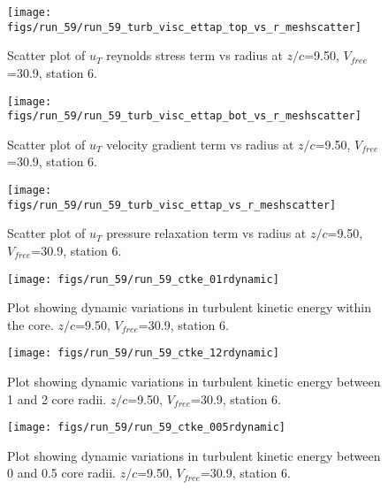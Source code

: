\begin{figure}[H]
\centering
\texttt{[image: figs/run\_59/run\_59\_turb\_visc\_ettap\_top\_vs\_r\_meshscatter]}
\caption{Scatter plot of $
u_T$ reynolds stress term vs radius at $z/c$=9.50, $V_{free}$=30.9, station 6.}
\label{fig:run_59_turb_visc_ettap_top_vs_r_meshscatter}
\end{figure}


\begin{figure}[H]
\centering
\texttt{[image: figs/run\_59/run\_59\_turb\_visc\_ettap\_bot\_vs\_r\_meshscatter]}
\caption{Scatter plot of $
u_T$ velocity gradient term vs radius at $z/c$=9.50, $V_{free}$=30.9, station 6.}
\label{fig:run_59_turb_visc_ettap_bot_vs_r_meshscatter}
\end{figure}


\begin{figure}[H]
\centering
\texttt{[image: figs/run\_59/run\_59\_turb\_visc\_ettap\_vs\_r\_meshscatter]}
\caption{Scatter plot of $
u_T$ pressure relaxation term vs radius at $z/c$=9.50, $V_{free}$=30.9, station 6.}
\label{fig:run_59_turb_visc_ettap_vs_r_meshscatter}
\end{figure}


\begin{figure}[H]
\centering
\texttt{[image: figs/run\_59/run\_59\_ctke\_01rdynamic]}
\caption{Plot showing dynamic variations in turbulent kinetic energy within the core. $z/c$=9.50, $V_{free}$=30.9, station 6.}
\label{fig:run_59_ctke_01rdynamic}
\end{figure}


\begin{figure}[H]
\centering
\texttt{[image: figs/run\_59/run\_59\_ctke\_12rdynamic]}
\caption{Plot showing dynamic variations in turbulent kinetic energy between 1 and 2 core radii. $z/c$=9.50, $V_{free}$=30.9, station 6.}
\label{fig:run_59_ctke_12rdynamic}
\end{figure}


\begin{figure}[H]
\centering
\texttt{[image: figs/run\_59/run\_59\_ctke\_005rdynamic]}
\caption{Plot showing dynamic variations in turbulent kinetic energy between 0 and 0.5 core radii. $z/c$=9.50, $V_{free}$=30.9, station 6.}
\label{fig:run_59_ctke_005rdynamic}
\end{figure}


